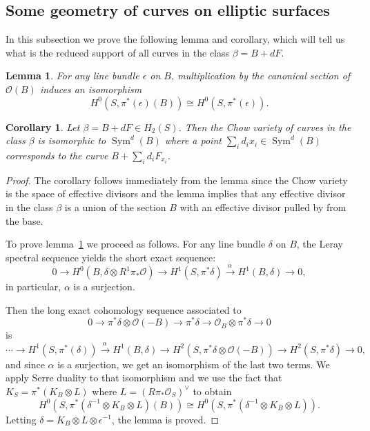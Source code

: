 \documentclass{amsart}
\newtheorem{lemma}[theorem]{Lemma}
\newtheorem{corollary}[theorem]{Corollary}
\theoremstyle{definition}
\renewcommand{\O}{\mathcal{O}}
\newcommand{\rt}[1]{\stackrel{#1\,}{\rightarrow}}
\newcommand{\Rt}[1]{\stackrel{#1\,}{\longrightarrow}}
\newcommand{\Sym}{\operatorname{Sym}}
\begin{document}
\subsection{Some geometry of curves on elliptic surfaces}\label{subsec: geometry of curves on elliptic surfaces}

In this subsection we prove the following lemma and corollary, which will tell us what is the reduced support of all curves in the class $\beta =B+dF$.

\begin{lemma}\label{lem: H0 (pi* (D) (B))=H0 (pi* (D))}
For any line bundle $\epsilon $ on $B$, multiplication by the
canonical section of $\O (B)$ induces an isomorphism
\[
H^{0} (S,\pi ^{*} (\epsilon ) (B)) \cong H^{0} (S,\pi ^{*} (\epsilon )).
\]
\end{lemma}

\begin{corollary} \label{cor: chow(beta) = sym (B)}
Let $\beta = B+dF \in H_{2} (S)$. Then the Chow variety of curves in
the class $\beta $ is isomorphic to $\Sym ^{d} (B)$ where a point
$\sum _{i}d_{i} x_{i}\in \Sym ^{d} (B)$ corresponds to the curve
$B+\sum _{i}d_{i} F_{x_{i}}$.
\end{corollary}

\begin{proof}
The corollary follows immediately from the lemma since the Chow
variety is the space of effective divisors and the lemma implies that
any effective divisor in the class $\beta $ is a union of the section
$B$ with an effective divisor pulled by from the base.

To prove lemma~\ref{lem: H0 (pi* (D) (B))=H0 (pi* (D))} we proceed as
follows. For any line bundle $\delta $ on $B$, the Leray spectral
sequence yields the short exact sequence:
\[
0\to H^{0} (B,\delta \otimes R^{1}\pi _{*}\O )\to H^{1} (S,\pi ^{*}\delta )\Rt{\alpha } H^{1} (B,\delta )\to 0,
\]
in particular, $\alpha $ is a surjection.

Then the long exact cohomology sequence associated to 
\[
0\to \pi ^{*}\delta \otimes \O (-B)\to \pi ^{*}\delta \to \O _{B}\otimes \pi ^{*}\delta \to 0
\]
is
\[
\dotsb \to H^{1} (S,\pi ^{*} (\delta ))\rt{\alpha }H^{1} (B,\delta )\to H^{2} (S,\pi ^{*}\delta \otimes \O (-B))\to H^{2} (S,\pi ^{*}\delta )\to 0,
\]
and since $\alpha $ is a surjection, we get an isomorphism of the last
two terms. We apply Serre duality to that isomorphism and we use the
fact that $K_{S} = \pi ^{*} (K_{B}\otimes L)$ where $L = \left(R\pi
_{*}\O _{S} \right)^{\vee }$ \cite[prop?]{Fr-Mo} to obtain
\[
H^{0} (S,\pi ^{*} (\delta ^{-1}\otimes K_{B}\otimes L) (B)) \cong H^{0}(S,\pi ^{*} (\delta ^{-1}\otimes K_{B}\otimes L)).
\]
Letting $\delta =K_{B}\otimes L\otimes \epsilon ^{-1}$, the lemma is
proved.
\end{proof}


     


\end{document}
